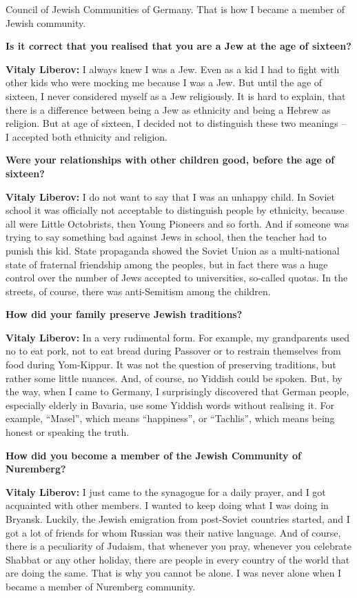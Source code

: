 Council of Jewish Communities of Germany. That is how I became a member of Jewish community.  

\textbf{Is it correct that you realised that you are a Jew at the age of sixteen?} 

\textbf{Vitaly Liberov:} I always knew I was a Jew. Even as a kid I had to fight with other kids who were mocking me because I was a Jew. But until the age of sixteen, I never considered myself as a Jew religiously. It is hard to explain, that there is a difference between being a Jew as ethnicity and being a Hebrew as religion. But at age of sixteen, I decided not to distinguish these two meanings – I accepted both ethnicity and religion.  

\textbf{Were your relationships with other children good, before the age of sixteen?} 

\textbf{Vitaly Liberov:} I do not want to say that I was an unhappy child. In Soviet school it was officially not acceptable to distinguish people by ethnicity, because all were Little Octobrists, then Young Pioneers and so forth. And if someone was trying to say something bad against Jews in school, then the teacher had to punish this kid. State propaganda showed the Soviet Union as a multi-national state of fraternal friendship among the peoples, but in fact there was a huge control over the number of Jews accepted to universities, so-called quotas. In the streets, of course, there was anti-Semitism among the children.  

\textbf{How did your family preserve Jewish traditions?} 

\textbf{Vitaly Liberov:} In a very rudimental form. For example, my grandparents used no to eat pork, not to eat bread during Passover or to restrain themselves from food during Yom-Kippur. It was not the question of preserving traditions, but rather some little nuances. And, of course, no Yiddish could be spoken. But, by the way, when I came to Germany, I surprisingly discovered that German people, especially elderly in Bavaria, use some Yiddish words without realising it. For example, “Masel”, which means “happiness”, or “Tachlis”, which means being honest or speaking the truth.  

\textbf{How did you become a member of the Jewish Community of Nuremberg?} 

\textbf{Vitaly Liberov:} I just came to the synagogue for a daily prayer, and I got acquainted with other members. I wanted to keep doing what I was doing in Bryansk. Luckily, the Jewish emigration from post-Soviet countries started, and I got a lot of friends for whom Russian was their native language. And of course, there is a peculiarity of Judaism, that whenever you pray, whenever you celebrate Shabbat or any other holiday, there are people in every country of the world that are doing the same. That is why you cannot be alone. I was never alone when I became a member of Nuremberg community.  

